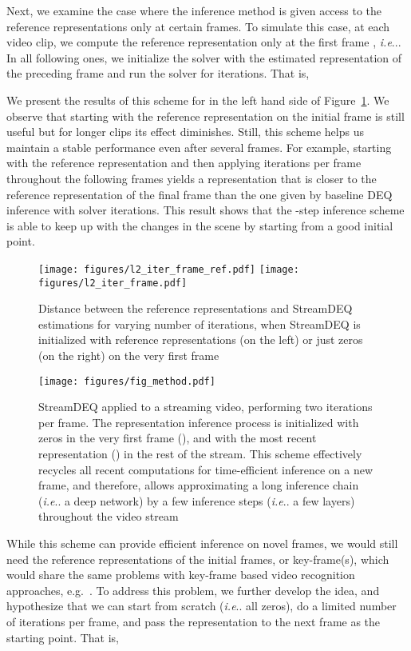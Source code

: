 \documentclass[runningheads]{llncs}
\makeatletter
\DeclareRobustCommand\onedot{\futurelet\@let@token\@onedot}
\def\@onedot{\ifx\@let@token.\else.\null\fi\xspace}
\def\ie{\emph{i.e}\onedot} \def\Ie{\emph{I.e}\onedot}
\makeatother
\begin{document}
Next, we examine the case where the inference method is given access to the reference representations only at certain frames. To simulate this case, at each video clip, we compute the reference representation only at the first frame , \ie . In all following ones, we initialize the solver with the estimated representation of the preceding frame and run the solver for  iterations. That is, 
 
We present the results of this scheme for  in the left hand side of Figure~\ref{fig:l2_iter_frame}. We observe that starting with the reference representation on the initial frame is still useful but for longer clips its effect diminishes. Still, this scheme helps us maintain a stable performance even after several frames. For example, starting with the reference representation and then applying  iterations per frame throughout the following  frames yields a representation that is closer to the reference representation of the final frame than the one given by baseline DEQ inference with  solver iterations. This result shows that the -step inference scheme is able to keep up with the changes in the scene by starting from a good initial point. 


\begin{figure}[t]
    \centering
    \texttt{[image: figures/l2\_iter\_frame\_ref.pdf]}
    \hfill
    \texttt{[image: figures/l2\_iter\_frame.pdf]} 
\caption{Distance between the reference representations and StreamDEQ estimations for varying number of iterations, when StreamDEQ is initialized with reference representations (on the left) or just zeros (on the right) on the very first frame}
\label{fig:l2_iter_frame}
\end{figure}


\begin{figure}[t]
\centering
\texttt{[image: figures/fig\_method.pdf]}
\caption{StreamDEQ applied to a streaming video, performing two iterations per frame. The representation inference process is initialized with zeros in the very first frame (), and with the most recent representation () in the rest of the stream. This scheme effectively recycles all recent computations for time-efficient inference on a new frame, and therefore, allows approximating a long inference chain (\ie a deep network) by a few inference steps (\ie a few layers) throughout the video stream}
\label{fig:model_picture}
\end{figure}


While this scheme can provide efficient inference on novel frames, we would still need the reference representations of the initial frames, or key-frame(s), which would share the same problems with key-frame based video recognition approaches, e.g.~\cite{zhu2017dff,xu2018dynamic,liu2019looking}. To address this problem, we further develop the idea, and hypothesize that we can start from scratch (\ie all zeros), do a limited number of iterations per frame, and pass the representation to the next frame as the starting point. That is, 
 
\end{document}
